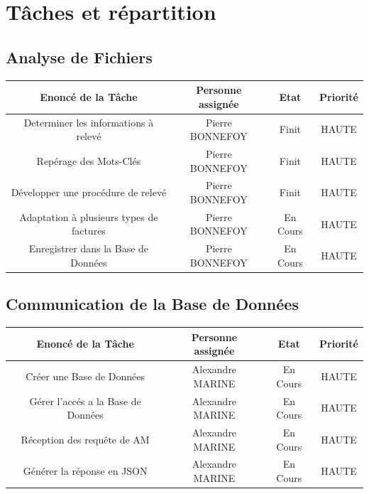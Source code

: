 \documentclass[a4paper, 11pt]{article}
\begin{document}
\section{Tâches et répartition}
    \subsection{Analyse de Fichiers}
    \begin{center}
    \begin{tabular}{|c|c|c|c|}
        \hline
        Enoncé de la Tâche & Personne assignée & Etat & Priorité\\
        \hline
        \hline
        Determiner les informations à relevé  & Pierre BONNEFOY & Finit & HAUTE \\
        \hline
        Repérage des Mots-Clés & Pierre BONNEFOY & Finit & HAUTE  \\
        \hline
        Développer une procédure de relevé & Pierre BONNEFOY & Finit & HAUTE  \\
        \hline
        Adaptation à plusieurs types de factures & Pierre BONNEFOY & En Cours & HAUTE  \\
        \hline
        Enregistrer dans la Base de Données & Pierre BONNEFOY & En Cours & HAUTE  \\
        \hline
    \end{tabular}
    \end{center}

    \subsection{Communication de la Base de Données}
    \begin{center}
    \begin{tabular}{|c|c|c|c|}
        \hline
        Enoncé de la Tâche & Personne assignée & Etat & Priorité\\
        \hline
        \hline
        Créer une Base de Données  & Alexandre MARINE & En Cours & HAUTE \\
        \hline
        Gérer l'accés a la Base de Données  & Alexandre MARINE & En Cours & HAUTE \\
        \hline
        Réception des requête de AM  & Alexandre MARINE & En Cours & HAUTE \\
        \hline
        Générer la réponse en JSON  & Alexandre MARINE & En Cours & HAUTE \\
        \hline
    \end{tabular}
    \end{center}
\end{document}
